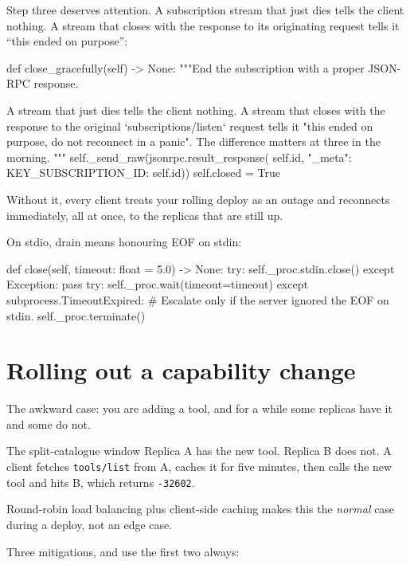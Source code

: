 Step three deserves attention. A subscription stream that just dies tells the
client nothing. A stream that closes with the response to its originating
request tells it ``this ended on purpose'':

\begin{py}
def close_gracefully(self) -> None:
    """End the subscription with a proper JSON-RPC response.

    A stream that just dies tells the client nothing. A stream that closes
    with the response to the original `subscriptions/listen` request tells
    it "this ended on purpose, do not reconnect in a panic". The difference
    matters at three in the morning.
    """
    self._send_raw(jsonrpc.result_response(
        self.id, {"_meta": {KEY_SUBSCRIPTION_ID: self.id}}))
    self.closed = True
\end{py}

Without it, every client treats your rolling deploy as an outage and reconnects
immediately, all at once, to the replicas that are still up.

On stdio, drain means honouring EOF on stdin:

\begin{py}
def close(self, timeout: float = 5.0) -> None:
    try:
        self._proc.stdin.close()
    except Exception:
        pass
    try:
        self._proc.wait(timeout=timeout)
    except subprocess.TimeoutExpired:
        # Escalate only if the server ignored the EOF on stdin.
        self._proc.terminate()
\end{py}

\section{Rolling out a capability change}

The awkward case: you are adding a tool, and for a while some replicas have it
and some do not.

\begin{dangerbox}{The split-catalogue window}
Replica A has the new tool. Replica B does not. A client fetches
\texttt{tools/list} from A, caches it for five minutes, then calls the new tool
and hits B, which returns \texttt{-32602}.

Round-robin load balancing plus client-side caching makes this the \emph{normal}
case during a deploy, not an edge case.
\end{dangerbox}

Three mitigations, and use the first two always:

